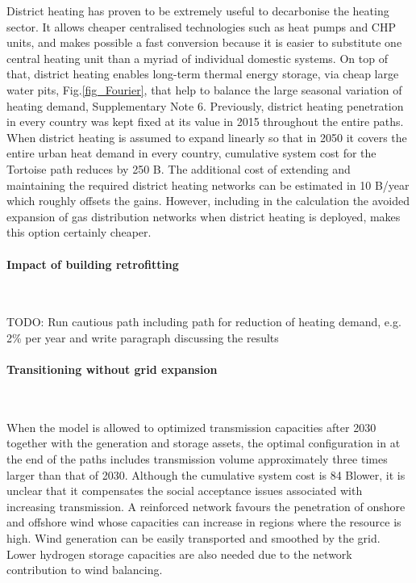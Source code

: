 \documentclass[5p]{elsarticle} %
\begin{document}
District heating has proven to be extremely useful to decarbonise the heating sector. It allows cheaper centralised technologies such as heat pumps and CHP units, and makes possible a fast conversion because it is easier to substitute one central heating unit than a myriad of individual domestic systems. On top of that, district heating enables long-term thermal energy storage, via cheap large water pits, Fig.\ref{fig_Fourier}, that help to balance the large seasonal variation of heating demand, Supplementary Note 6. Previously, district heating penetration in every country was kept fixed at its value in 2015 \cite{DH_penetration} throughout the entire paths. When district heating is assumed to expand linearly so that in 2050 it covers the entire urban heat demand in every country, cumulative system cost for the Tortoise path reduces by 250 B\EUR. The additional cost of extending and maintaining the required district heating networks can be estimated in 10 B\EUR/year \cite{Brown_2018} which roughly offsets the gains. However, including in the calculation the avoided expansion of gas distribution networks when district heating is deployed, makes this option certainly cheaper. 

\paragraph{\textbf{Impact of building retrofitting}} \


\textcolor[rgb]{1,0,0}{TODO: Run cautious path including path for reduction of heating demand, e.g. 2\% per year and write paragraph discussing the results}


\paragraph{\textbf{Transitioning without grid expansion}} \

When the model is allowed to optimized transmission capacities after 2030 together with the generation and storage assets, the optimal configuration in at the end of the paths includes transmission volume approximately three times larger than that of 2030.  Although the cumulative system cost is 84 B\EUR lower, it is unclear that it compensates the social acceptance issues associated with increasing transmission. A reinforced network favours the penetration of onshore and offshore wind whose capacities can increase in regions where the resource is high. Wind generation can be easily transported and smoothed by the grid. Lower hydrogen storage capacities are also needed due to the network contribution to wind balancing. 
\end{document}
